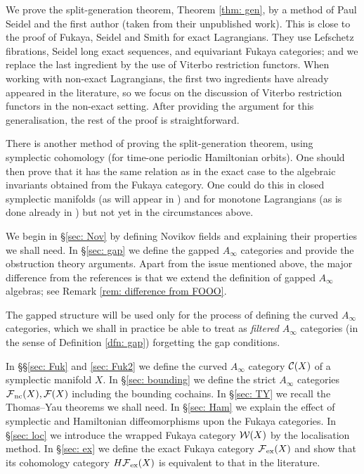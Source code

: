 \documentclass{article}
\theoremstyle{plain}%
\theoremstyle{definition}
\numberwithin{equation}{section}
\numberwithin{figure}{section}
\def\cC{{\mathbin{\cal C}}}
\def\cF{{\mathbin{\cal F}}}
\def\cW{{\mathbin{\cal W}}}
\def\iy{\infty}
\def\ex{{   {\rm ex}    }}\def\virt{{   {\rm virt}    }}\def\ev{{\rm ev}}\def\sing{{\rm sing}}\def\cont{{\rm cont}}
\begin{document}
We prove the split-generation theorem, Theorem \ref{thm: gen}, by a method of Paul Seidel and the first author (taken from their unpublished work). This is close to the proof of Fukaya, Seidel and Smith \cite{FSS1} for exact Lagrangians. They use Lefschetz fibrations, Seidel long exact sequences, and equivariant Fukaya categories; and we replace the last ingredient by the use of Viterbo restriction functors. When working with non-exact Lagrangians, the first two ingredients have already appeared in the literature, so we focus on the discussion of Viterbo restriction functors in the non-exact setting. After providing the argument for this generalisation, the rest of the proof is straightforward.

There is another method \cite{Ab1} of proving the split-generation theorem, using symplectic cohomology (for time-one periodic Hamiltonian orbits). One should then prove that it has the same relation as in the exact case to the algebraic invariants obtained from the Fukaya category.
One could do this in closed symplectic manifolds (as will appear in \cite{AFOOO}) and for monotone Lagrangians (as is done already in \cite{RitterSmith}) but not yet in the circumstances above.  


We begin in \S\ref{sec: Nov} by defining Novikov fields and explaining their properties we shall need. In \S\ref{sec: gap} we define the gapped $A_\iy$ categories and provide the obstruction theory arguments. Apart from the issue mentioned above, the major difference from the references \cite{FOOO,AJ} is that we extend the definition of gapped $A_\iy$ algebras; see Remark \ref{rem: difference from FOOO}. %

The gapped structure will be used only for the process of defining the curved $A_\iy$ categories, which we shall in practice be able to treat as {\it filtered} $A_\iy$ categories (in the sense of Definition \ref{dfn: gap}) forgetting the gap conditions.

In \S\S\ref{sec: Fuk} and \ref{sec: Fuk2} we define the curved $A_\iy$ category $\cC(X)$ of a symplectic manifold $X.$
In \S\ref{sec: bounding} we define the strict $A_\iy$ categories $\cF_\nc(X),\cF(X)$ including the bounding cochains.
In \S\ref{sec: TY} we recall the Thomas--Yau theorems we shall need.
In \S\ref{sec: Ham} we explain the effect of symplectic and Hamiltonian diffeomorphisms upon the Fukaya categories.
In \S\ref{sec: loc} we introduce the wrapped Fukaya category $\cW(X)$ by the localisation method. 
In \S\ref{sec: ex} we define the exact Fukaya category $\cF_\ex(X)$ and show that its cohomology category $H\cF_\ex(X)$ is equivalent to that in the literature. 
\end{document}
